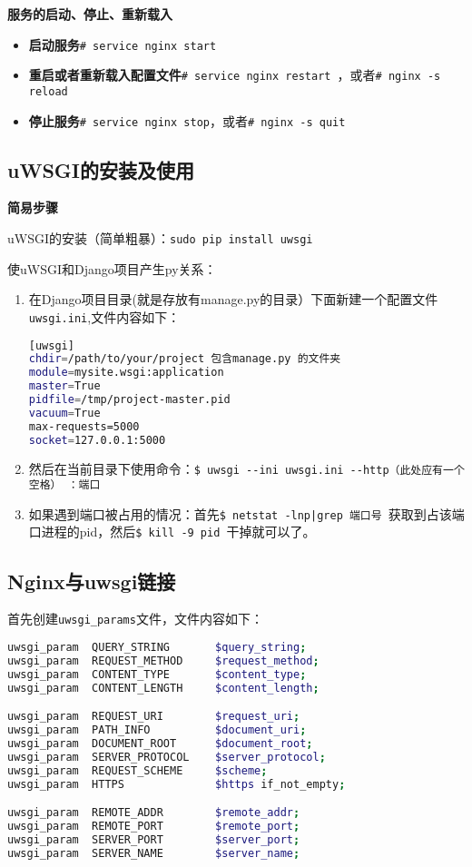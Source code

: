 \documentclass[cyan]{elegantnote}
\begin{document}
\textbf{服务的启动、停止、重新载入}
\begin{itemize}
\item \textbf{启动服务}\verb!# service nginx start!
\item \textbf{重启或者重新载入配置文件}\verb!# service nginx restart !，或者\verb!# nginx -s reload !
\item \textbf{停止服务}\verb!# service nginx stop!，或者\verb！# nginx -s quit！
\end{itemize}


\subsection{uWSGI的安装及使用}
\textbf{简易步骤}

uWSGI的安装（简单粗暴）：\verb|sudo pip install uwsgi|

使uWSGI和Django项目产生py关系：
\begin{enumerate}
\item 在Django项目目录(就是存放有manage.py的目录）下面新建一个配置文件\verb|uwsgi.ini|,文件内容如下：
\begin{lstlisting}[language=bash,caption=uwsgi.ini]
[uwsgi] 
chdir=/path/to/your/project 包含manage.py 的文件夹 
module=mysite.wsgi:application  
master=True 
pidfile=/tmp/project-master.pid 
vacuum=True 
max-requests=5000 
socket=127.0.0.1:5000
\end{lstlisting}
\item 然后在当前目录下使用命令：\verb|$ uwsgi --ini uwsgi.ini --http（此处应有一个空格） ：端口|
\item 如果遇到端口被占用的情况：首先\verb！$ netstat -lnp|grep 端口号 ！获取到占该端口进程的pid，然后\verb|$ kill -9 pid |干掉就可以了。
\end{enumerate}
\subsection{Nginx与uwsgi链接}
首先创建\verb|uwsgi_params|文件，文件内容如下：
\begin{lstlisting}[language=bash,caption=uwsgi]
uwsgi_param  QUERY_STRING       $query_string;
uwsgi_param  REQUEST_METHOD     $request_method;
uwsgi_param  CONTENT_TYPE       $content_type;
uwsgi_param  CONTENT_LENGTH     $content_length;

uwsgi_param  REQUEST_URI        $request_uri;
uwsgi_param  PATH_INFO          $document_uri;
uwsgi_param  DOCUMENT_ROOT      $document_root;
uwsgi_param  SERVER_PROTOCOL    $server_protocol;
uwsgi_param  REQUEST_SCHEME     $scheme;
uwsgi_param  HTTPS              $https if_not_empty;

uwsgi_param  REMOTE_ADDR        $remote_addr;
uwsgi_param  REMOTE_PORT        $remote_port;
uwsgi_param  SERVER_PORT        $server_port;
uwsgi_param  SERVER_NAME        $server_name;
\end{lstlisting}
\end{document}

